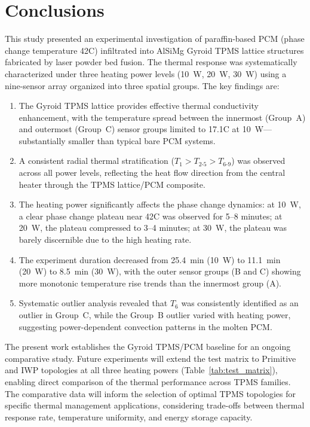 \section{Conclusions}
\label{sec:conclusion}

This study presented an experimental investigation of paraffin-based PCM (phase change temperature 42\textdegree C) infiltrated into AlSiMg Gyroid TPMS lattice structures fabricated by laser powder bed fusion. The thermal response was systematically characterized under three heating power levels (10~W, 20~W, 30~W) using a nine-sensor array organized into three spatial groups. The key findings are:

\begin{enumerate}[nosep]
  \item The Gyroid TPMS lattice provides effective thermal conductivity enhancement, with the temperature spread between the innermost (Group~A) and outermost (Group~C) sensor groups limited to 17.1\textdegree C at 10~W---substantially smaller than typical bare PCM systems.

  \item A consistent radial thermal stratification ($T_1 > T_{2\text{-}5} > T_{6\text{-}9}$) was observed across all power levels, reflecting the heat flow direction from the central heater through the TPMS lattice/PCM composite.

  \item The heating power significantly affects the phase change dynamics: at 10~W, a clear phase change plateau near 42\textdegree C was observed for 5--8 minutes; at 20~W, the plateau compressed to 3--4 minutes; at 30~W, the plateau was barely discernible due to the high heating rate.

  \item The experiment duration decreased from 25.4~min (10~W) to 11.1~min (20~W) to 8.5~min (30~W), with the outer sensor groups (B and C) showing more monotonic temperature rise trends than the innermost group (A).

  \item Systematic outlier analysis revealed that $T_6$ was consistently identified as an outlier in Group~C, while the Group~B outlier varied with heating power, suggesting power-dependent convection patterns in the molten PCM.
\end{enumerate}

The present work establishes the Gyroid TPMS/PCM baseline for an ongoing comparative study. Future experiments will extend the test matrix to Primitive and IWP topologies at all three heating powers (Table~\ref{tab:test_matrix}), enabling direct comparison of the thermal performance across TPMS families. The comparative data will inform the selection of optimal TPMS topologies for specific thermal management applications, considering trade-offs between thermal response rate, temperature uniformity, and energy storage capacity.

